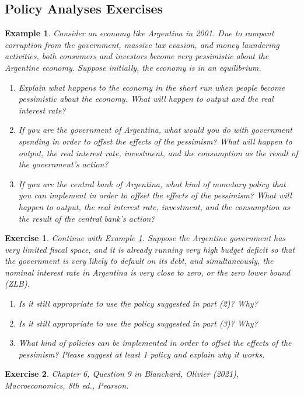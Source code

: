 \documentclass[12pt]{article}
\newtheorem{example}{Example}
\newtheorem{exercise}{Exercise}
\begin{document}
\subsection*{Policy Analyses Exercises}
\begin{example}\label{eg:arg}
    Consider an economy like Argentina in 2001. Due to rampant corruption from the government, massive tax evasion, and money laundering activities, both consumers and investors become very pessimistic about the Argentine economy. Suppose initially, the economy is in an equilibrium. 
    \begin{enumerate}[label=(\arabic*)]
        \item Explain what happens to the economy in the short run when people become pessimistic about the economy. What will happen to output and the real interest rate?
        \item If you are the government of Argentina, what would you do with government spending in order to offset the effects of the pessimism? What will happen to output, the real interest rate, investment, and the consumption as the result of the government's action?
        \item If you are the central bank of Argentina, what kind of monetary policy that you can implement in order to offset the effects of the pessimism? What will happen to output, the real interest rate, investment, and the consumption as the result of the central bank's action?
    \end{enumerate}
\end{example}

\begin{exercise}
    Continue with Example \ref{eg:arg}. Suppose the Argentine government has very limited fiscal space, and it is already running very high budget deficit so that the government is very likely to default on its debt, and simultaneously, the nominal interest rate in Argentina is very close to zero, or the zero lower bound (ZLB). 
    \begin{enumerate}[label=(\arabic*)]
        \item Is it still appropriate to use the policy suggested in part (2)? Why?
        \item Is it still appropriate to use the policy suggested in part (3)? Why?
        \item What kind of policies can be implemented in order to offset the effects of the pessimism? Please suggest at least 1 policy and explain why it works.
    \end{enumerate}
\end{exercise}

\begin{exercise}
    Chapter 6, Question 9 in Blanchard, Olivier (2021), \textit{Macroeconomics}, 8th ed., Pearson.
\end{exercise}
\end{document}
